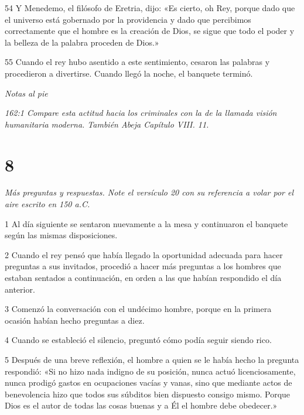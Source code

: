 \par 54 Y Menedemo, el filósofo de Eretria, dijo: «Es cierto, oh Rey, porque dado que el universo está gobernado por la providencia y dado que percibimos correctamente que el hombre es la creación de Dios, se sigue que todo el poder y la belleza de la palabra proceden de Dios.»

\par 55 Cuando el rey hubo asentido a este sentimiento, cesaron las palabras y procedieron a divertirse. Cuando llegó la noche, el banquete terminó.

\par \textit{Notas al pie}

\par \textit{162:1 Compare esta actitud hacia los criminales con la de la llamada visión humanitaria moderna. También Abeja Capítulo VIII. 11.}

\chapter{8}

\par \textit{Más preguntas y respuestas. Note el versículo 20 con su referencia a volar por el aire escrito en 150 a.C.}

\par 1 Al día siguiente se sentaron nuevamente a la mesa y continuaron el banquete según las mismas disposiciones.

\par 2 Cuando el rey pensó que había llegado la oportunidad adecuada para hacer preguntas a sus invitados, procedió a hacer más preguntas a los hombres que estaban sentados a continuación, en orden a las que habían respondido el día anterior.

\par 3 Comenzó la conversación con el undécimo hombre, porque en la primera ocasión habían hecho preguntas a diez.

\par 4 Cuando se estableció el silencio, preguntó cómo podía seguir siendo rico.

\par 5 Después de una breve reflexión, el hombre a quien se le había hecho la pregunta respondió: «Si no hizo nada indigno de su posición, nunca actuó licenciosamente, nunca prodigó gastos en ocupaciones vacías y vanas, sino que mediante actos de benevolencia hizo que todos sus súbditos bien dispuesto consigo mismo. Porque Dios es el autor de todas las cosas buenas y a Él el hombre debe obedecer.»

